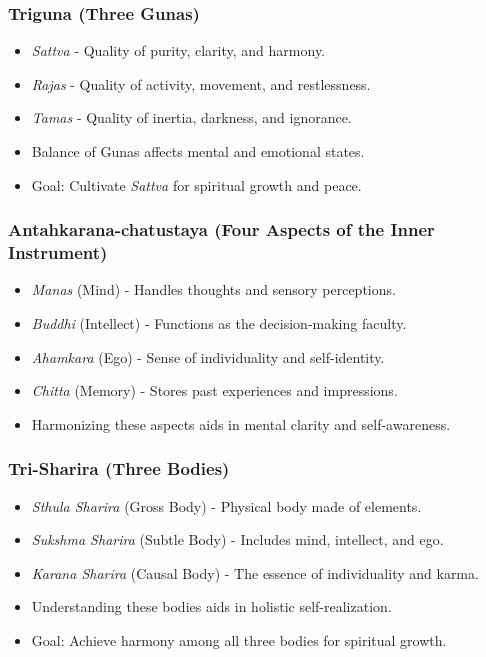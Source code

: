 \begin{frame}[fragile]\frametitle{Triguna (Three Gunas)}

      \begin{itemize}
		\item \textit{Sattva} - Quality of purity, clarity, and harmony.
		\item \textit{Rajas} - Quality of activity, movement, and restlessness.
		\item \textit{Tamas} - Quality of inertia, darkness, and ignorance.
		\item Balance of Gunas affects mental and emotional states.
		\item Goal: Cultivate \textit{Sattva} for spiritual growth and peace.
	  \end{itemize}

\end{frame}

\begin{frame}[fragile]\frametitle{Antahkarana-chatustaya (Four Aspects of the Inner Instrument)}

      \begin{itemize}
		\item \textit{Manas} (Mind) - Handles thoughts and sensory perceptions.
		\item \textit{Buddhi} (Intellect) - Functions as the decision-making faculty.
		\item \textit{Ahamkara} (Ego) - Sense of individuality and self-identity.
		\item \textit{Chitta} (Memory) - Stores past experiences and impressions.
		\item Harmonizing these aspects aids in mental clarity and self-awareness.
	  \end{itemize}

\end{frame}

\begin{frame}[fragile]\frametitle{Tri-Sharira (Three Bodies)}

      \begin{itemize}
		\item \textit{Sthula Sharira} (Gross Body) - Physical body made of elements.
		\item \textit{Sukshma Sharira} (Subtle Body) - Includes mind, intellect, and ego.
		\item \textit{Karana Sharira} (Causal Body) - The essence of individuality and karma.
		\item Understanding these bodies aids in holistic self-realization.
		\item Goal: Achieve harmony among all three bodies for spiritual growth.
	  \end{itemize}

\end{frame}

